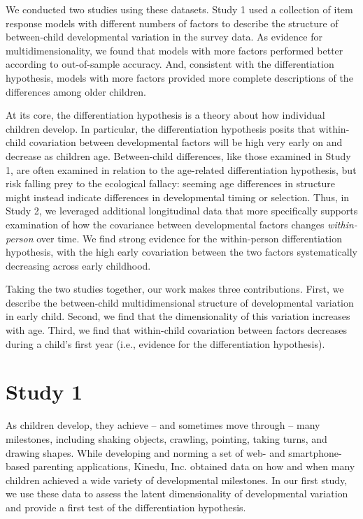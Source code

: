 \documentclass[man, floatsintext]{apa7}
\begin{document}
We conducted two studies using these datasets. Study 1 used a collection
of item response models with different numbers of factors to describe
the structure of between-child developmental variation in the survey
data. As evidence for multidimensionality, we found that models with
more factors performed better according to out-of-sample accuracy. And,
consistent with the differentiation hypothesis, models with more factors
provided more complete descriptions of the differences among older
children.

At its core, the differentiation hypothesis is a theory about how
individual children develop. In particular, the differentiation
hypothesis posits that within-child covariation between developmental
factors will be high very early on and decrease as children age.
Between-child differences, like those examined in Study 1, are often
examined in relation to the age-related differentiation hypothesis, but
risk falling prey to the ecological fallacy: seeming age differences in structure might
instead indicate differences in developmental timing or selection. Thus,
in Study 2, we leveraged additional longitudinal data that more
specifically supports examination of how the covariance between
developmental factors changes \emph{within-person} over time.
We find strong evidence for the
within-person differentiation hypothesis, with the high early
covariation between the two factors systematically decreasing across
early childhood.

Taking the two studies together, our work makes three contributions.
First, we describe the between-child multidimensional structure of
developmental variation in early child. Second, we find that the
dimensionality of this variation increases with age. Third, we find that
within-child covariation between factors decreases during a child's
first year (i.e., evidence for the differentiation hypothesis).

\section{Study 1}

As children develop, they achieve -- and sometimes move through -- many milestones,
including shaking objects, crawling, pointing, taking turns, and drawing
shapes. While developing and norming a set of web- and smartphone-based
parenting applications, Kinedu, Inc. obtained data on how and when many
children achieved a wide variety of developmental milestones. In our first study, we use these data to assess the latent dimensionality of developmental variation and provide a first test of the differentiation hypothesis.
\end{document}
